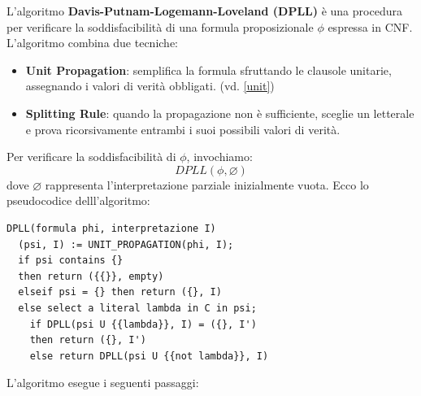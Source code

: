 L'algoritmo \textbf{Davis-Putnam-Logemann-Loveland
(DPLL)} è una procedura per verificare la
soddisfacibilità di una formula proposizionale
$\phi$ espressa in CNF.
L'algoritmo combina due tecniche:
\begin{itemize}
    \item \textbf{Unit Propagation}: semplifica la
    formula sfruttando le clausole unitarie,
    assegnando i valori di verità obbligati. (vd. \ref{unit})

    \item \textbf{Splitting Rule}: quando la
    propagazione non è sufficiente, sceglie un
    letterale e prova ricorsivamente entrambi
    i suoi possibili valori di verità.
\end{itemize}
Per verificare la soddisfacibilità di $\phi$,
invochiamo:
\[
DPLL(\phi,\varnothing)
\]
dove $\varnothing$ rappresenta l'interpretazione
parziale inizialmente vuota. Ecco lo pseudocodice delll'algoritmo:\smallskip\\
\begin{center}
\begin{minipage}{0.75\textwidth}
\begin{verbatim}
DPLL(formula phi, interpretazione I)
  (psi, I) := UNIT_PROPAGATION(phi, I);
  if psi contains {}
  then return ({{}}, empty)
  elseif psi = {} then return ({}, I)
  else select a literal lambda in C in psi;
    if DPLL(psi U {{lambda}}, I) = ({}, I')
    then return ({}, I')
    else return DPLL(psi U {{not lambda}}, I)
\end{verbatim}
\end{minipage}
\end{center}
\noindent L'algoritmo esegue i seguenti passaggi:
